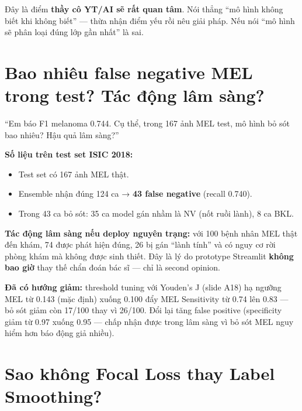 \documentclass[11pt,a4paper]{article}
\begin{document}
\begin{tip}
Đây là điểm \textbf{thầy cô YT/AI sẽ rất quan tâm}. Nói thẳng ``mô hình không biết khi không biết'' --- thừa nhận điểm yếu rồi nêu giải pháp. Nếu nói ``mô hình sẽ phân loại đúng lớp gần nhất'' là sai.
\end{tip}

\section{Bao nhiêu false negative MEL trong test? Tác động lâm sàng?}

\begin{question}
``Em báo F1 melanoma 0.744. Cụ thể, trong 167 ảnh MEL test, mô hình bỏ sót bao nhiêu? Hậu quả lâm sàng?''
\end{question}

\begin{answer}
\textbf{Số liệu trên test set ISIC 2018:}
\begin{itemize}[leftmargin=*]
  \item Test set có 167 ảnh MEL thật.
  \item Ensemble nhận đúng 124 ca → \textbf{43 false negative} (recall 0.740).
  \item Trong 43 ca bỏ sót: 35 ca model gán nhầm là NV (nốt ruồi lành), 8 ca BKL.
\end{itemize}

\textbf{Tác động lâm sàng nếu deploy nguyên trạng:} với 100 bệnh nhân MEL thật đến khám, 74 được phát hiện đúng, 26 bị gán ``lành tính'' và có nguy cơ rời phòng khám mà không được sinh thiết. Đây là lý do prototype Streamlit \textbf{không bao giờ} thay thế chẩn đoán bác sĩ --- chỉ là second opinion.

\textbf{Đã có hướng giảm:} threshold tuning với Youden's J (slide A18) hạ ngưỡng MEL từ 0.143 (mặc định) xuống 0.100 đẩy MEL Sensitivity từ 0.74 lên 0.83 --- bỏ sót giảm còn 17/100 thay vì 26/100. Đổi lại tăng false positive (specificity giảm từ 0.97 xuống 0.95 --- chấp nhận được trong lâm sàng vì bỏ sót MEL nguy hiểm hơn báo động giả nhiều).
\end{answer}

\section{Sao không Focal Loss thay Label Smoothing?}
\end{document}
